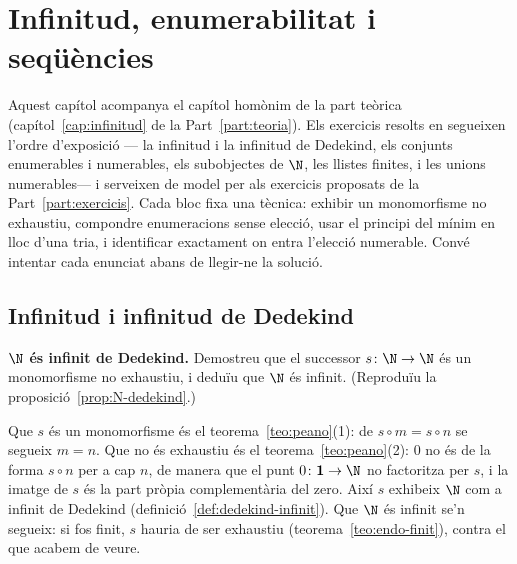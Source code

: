 \chapter{Infinitud, enumerabilitat i seqüències}\label{cap:practica-infinitud}

Aquest capítol acompanya el capítol homònim de la part teòrica (capítol~\ref{cap:infinitud} de la Part~\ref{part:teoria}). Els exercicis resolts en segueixen l'ordre d'exposició --- la infinitud i la infinitud de Dedekind, els conjunts enumerables i numerables, els subobjectes de \(\N\), les llistes finites, i les unions numerables--- i serveixen de model per als exercicis proposats de la Part~\ref{part:exercicis}. Cada bloc fixa una tècnica: exhibir un monomorfisme no exhaustiu, compondre enumeracions sense elecció, usar el principi del mínim en lloc d'una tria, i identificar exactament on entra l'elecció numerable. Convé intentar cada enunciat abans de llegir-ne la solució.

\section{Infinitud i infinitud de Dedekind}\label{prac:infinits}

\begin{exercici}
\textbf{\(\N\) és infinit de Dedekind.} Demostreu que el successor \(s\colon\N\to\N\) és un monomorfisme no exhaustiu, i deduïu que \(\N\) és infinit. (Reproduïu la proposició~\ref{prop:N-dedekind}.)
\end{exercici}
\begin{solucio}
Que \(s\) és un monomorfisme és el teorema~\ref{teo:peano}(1): de \(s\circ m=s\circ n\) se segueix \(m=n\). Que no és exhaustiu és el teorema~\ref{teo:peano}(2): \(0\) no és de la forma \(s\circ n\) per a cap \(n\), de manera que el punt \(0\colon\mathbf1\to\N\) no factoritza per \(s\), i la imatge de \(s\) és la part pròpia complementària del zero. Així \(s\) exhibeix \(\N\) com a infinit de Dedekind (definició~\ref{def:dedekind-infinit}). Que \(\N\) és infinit se'n segueix: si fos finit, \(s\) hauria de ser exhaustiu (teorema~\ref{teo:endo-finit}), contra el que acabem de veure.
\end{solucio}

